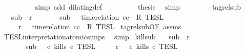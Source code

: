 \begin{isabellebody}
\ \ \ \ \ \ \ \ \isamarkupfalse%
\ {\isacharparenleft}simp\ add{\isacharcolon}\ dilating{\isacharunderscore}def{\isacharparenright}\isanewline
\ \ \ \ \ \ \isamarkupfalse%
\ \isamarkupfalse%
\ {\isacharquery}thesis\ \isamarkupfalse%
\ simp\isanewline
\ \ \ \ \isamarkupfalse%
\isanewline
\ \ \isamarkupfalse%
\isanewline
{}\isamarkupfalse%
%
\endisatagproof
{\isafoldproof}%
%
\isadelimproof
\isanewline
%
\endisadelimproof
\isanewline
{}\isamarkupfalse%
\ tagrel{\isacharunderscore}sub{\isacharcolon}\isanewline
\ \ \ {\isacartoucheopen}sub\ {\isasymlless}\ r{\isacartoucheclose}\isanewline
\ \ \ \ \ \ \ {\isacartoucheopen}sub\ {\isasymin}\ {\isasymlbrakk}\ time{\isacharminus}relation\ {\isasymlfloor}cc\ {\isasymin}\ R\ {\isasymrbrakk}\isactrlsub T\isactrlsub E\isactrlsub S\isactrlsub L{\isacartoucheclose}\isanewline
\ \ \ \ \ {\isacartoucheopen}r\ {\isasymin}\ {\isasymlbrakk}\ time{\isacharminus}relation\ {\isasymlfloor}cc\ {\isasymin}\ R\ {\isasymrbrakk}\isactrlsub T\isactrlsub E\isactrlsub S\isactrlsub L{\isacartoucheclose}\isanewline
%
\isadelimproof
%
\endisadelimproof
%
\isatagproof
{}\isamarkupfalse%
\ tagrel{\isacharunderscore}sub{\isacharprime}{\isacharbrackleft}OF\ assms{\isacharbrackright}\ \isamarkupfalse%
\ TESL{\isacharunderscore}interpretation{\isacharunderscore}atomic{\isachardot}simps{\isacharparenleft}{}{\isacharparenright}\ \isamarkupfalse%
\ simp%
\endisatagproof
{\isafoldproof}%
%
\isadelimproof
\isanewline
%
\endisadelimproof
\isanewline
{}\isamarkupfalse%
\ kill{\isacharunderscore}sub{\isacharcolon}\isanewline
\ \ \ {\isacartoucheopen}sub\ {\isasymlless}\ r{\isacartoucheclose}\isanewline
\ \ \ \ \ \ \ {\isacartoucheopen}sub\ {\isasymin}\ {\isasymlbrakk}\ c\ kills\ c\ {\isasymrbrakk}\isactrlsub T\isactrlsub E\isactrlsub S\isactrlsub L{\isacartoucheclose}\isanewline
\ \ \ \ \ {\isacartoucheopen}r\ {\isasymin}\ {\isasymlbrakk}\ c\ kills\ c\ {\isasymrbrakk}\isactrlsub T\isactrlsub E\isactrlsub S\isactrlsub L{\isacartoucheclose}\isanewline
%
\isadelimproof
%

\end{isabellebody}
